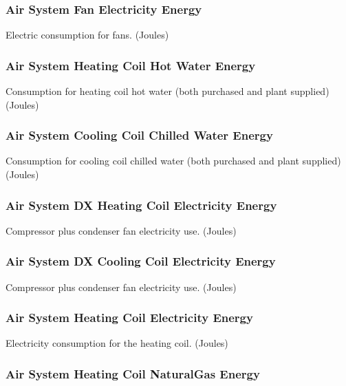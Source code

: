 \subsubsection{Air System Fan Electricity Energy}\label{air-system-fan-electric-energy}

Electric consumption for fans. (Joules)

\subsubsection{Air System Heating Coil Hot Water Energy}\label{air-system-heating-coil-hot-water-energy}

Consumption for heating coil hot water (both purchased and plant supplied) (Joules)

\subsubsection{Air System Cooling Coil Chilled Water Energy}\label{air-system-cooling-coil-chilled-water-energy}

Consumption for cooling coil chilled water (both purchased and plant supplied) (Joules)

\subsubsection{Air System DX Heating Coil Electricity Energy}\label{air-system-dx-heating-coil-electric-energy}

Compressor plus condenser fan electricity use. (Joules)

\subsubsection{Air System DX Cooling Coil Electricity Energy}\label{air-system-dx-cooling-coil-electric-energy}

Compressor plus condenser fan electricity use. (Joules)

\subsubsection{Air System Heating Coil Electricity Energy}\label{air-system-heating-coil-electric-energy}

Electricity consumption for the heating coil. (Joules)

\subsubsection{Air System Heating Coil NaturalGas Energy}\label{air-system-heating-coil-gas-energy}

